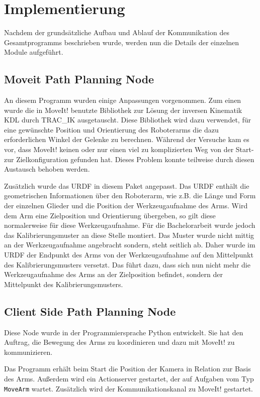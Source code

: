 \chapter{Implementierung}
\label{chap:implementierung}
Nachdem der grundsätzliche Aufbau und Ablauf der Kommunikation des Gesamtprogramms beschrieben wurde, werden nun die Details der einzelnen Module aufgeführt.

\section{Moveit Path Planning Node} %
\label{sec:universal_robot_impl}
An diesem Programm wurden einige Anpassungen vorgenommen. Zum einen wurde die in MoveIt! benutzte Bibliothek zur Lösung der inversen Kinematik KDL durch TRAC\_IK ausgetauscht. Diese Bibliothek wird dazu verwendet, für eine gewünschte Position und Orientierung des Roboterarms die dazu erforderlichen Winkel der Gelenke zu berechnen. Während der Versuche kam es vor, dass MoveIt! keinen oder nur einen viel zu komplizierten Weg von der Start- zur Zielkonfiguration gefunden hat. Dieses Problem konnte teilweise durch diesen Austausch behoben werden.

Zusätzlich wurde das URDF in diesem Paket angepasst. Das URDF enthält die geometrischen Informationen über den Roboterarm, wie z.B. die Länge und Form der einzelnen Glieder und die Position der Werkzeugaufnahme des Arms. Wird dem Arm eine Zielposition und Orientierung übergeben, so gilt diese normalerweise für diese Werkzeugaufnahme. Für die Bachelorarbeit wurde jedoch das Kalibrierungsmuster an diese Stelle montiert. Das Muster wurde nicht mittig an der Werkzeugaufnahme angebracht sondern, steht seitlich ab. Daher wurde im URDF der Endpunkt des Arms von der Werkzeugaufnahme auf den Mittelpunkt des Kalibrierungsmusters versetzt. Das führt dazu, dass sich nun nicht mehr die Werkzeugaufnahme des Arms an der Zielposition befindet, sondern der Mittelpunkt des Kalibrierungsmusters.

\section{Client Side Path Planning Node} %
\label{sec:movearmserver_impl}
Diese Node wurde in der Programmiersprache Python entwickelt. Sie hat den Auftrag, die Bewegung des Arms zu koordinieren und dazu mit MoveIt! zu kommunizieren.

Das Programm erhält beim Start die Position der Kamera in Relation zur Basis des Arms. Außerdem wird ein Actionserver gestartet, der auf Aufgaben vom Typ \texttt{MoveArm} wartet. Zusätzlich wird der Kommunikationskanal zu MoveIt! gestartet.

